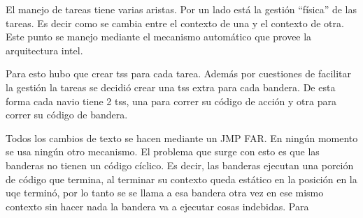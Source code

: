 	El manejo de tareas tiene varias aristas. Por un lado está
la gestión ``física'' de las tareas. Es decir como se cambia entre el contexto
de una y el contexto de otra. Este punto se manejo mediante el mecanismo
automático que provee la arquitectura intel.

	Para esto hubo que crear tss para cada tarea. Además por cuestiones
de facilitar la gestión la tareas se decidió crear una tss extra para cada
bandera. De esta forma cada navio tiene 2 tss, una para correr su código
de acción y otra para correr su código de bandera.

	Todos los cambios de texto se hacen mediante un JMP FAR. En ningún
momento se usa ningún otro mecanismo. El problema que surge con
esto es que las banderas no tienen un código cíclico. Es decir, las banderas
ejecutan una porción de código que termina, al terminar su contexto queda
estático en la posición en la uqe terminó, por lo tanto se se llama a esa bandera
otra vez en ese mismo contexto sin hacer nada la bandera va a ejecutar 
cosas indebidas. Para
